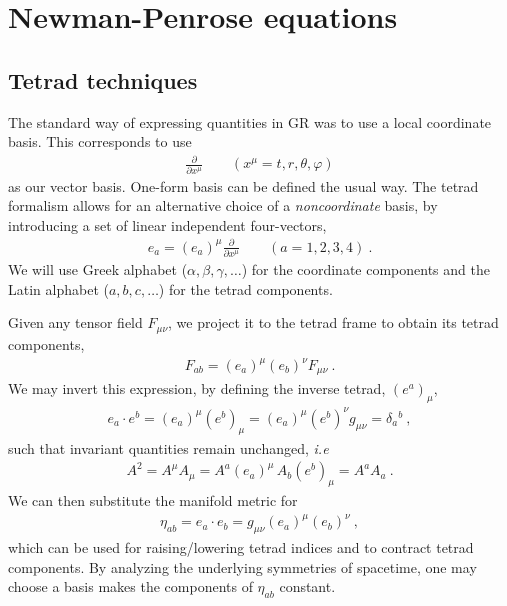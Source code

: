 
\chapter{Newman-Penrose equations} %
\label{AppendixTetrad}

\section{Tetrad techniques}

The standard way of expressing quantities in GR was to use a local coordinate basis. This corresponds to use
\begin{align}
   \frac{\partial}{\partial x^\mu} \qquad ( x^\mu = t,r,\theta,\varphi )
\end{align}
as our vector basis. One-form basis can be defined the usual way. The tetrad formalism allows for an alternative choice of a \emph{noncoordinate} basis, by introducing a set of linear independent four-vectors, 
\begin{align}
    e_a = (e_a)^\mu \frac{\partial}{\partial x^\mu} \qquad ( a = 1,2,3,4 ) ~.
 \end{align}
We will use Greek alphabet ($\alpha,\beta,\gamma,\dots$) for the coordinate components and the Latin alphabet ($a,b,c,\dots$) for the tetrad components.

Given any tensor field $F_{\mu\nu}$, we project it to the tetrad frame to obtain its tetrad components,
\begin{align}
    F_{ab} = (e_a)^\mu (e_b)^\nu F_{\mu\nu} ~.
\end{align}
We may invert this expression, by defining the inverse tetrad, $(e^a)_\mu$,
\begin{align}
    e_a \cdot e^b = (e_a)^\mu (e^b)_\mu = (e_a)^\mu (e^b)^\nu g_{\mu\nu} = \delta_a{}^b ~,
\end{align}
such that invariant quantities remain unchanged, \emph{i.e}
\begin{align}
    A^2 = A^\mu A_\mu = A^a (e_a)^\mu \, A_b (e^b)_\mu = A^a A_a~.
\end{align}
We can then substitute the manifold metric for
\begin{align}
    \eta_{ab} = e_a \cdot e_b = g_{\mu\nu} (e_a)^\mu (e_b)^\nu ~,
\end{align}
which can be used for raising/lowering tetrad indices and to contract tetrad components.
By analyzing the underlying symmetries of spacetime, one may choose a basis makes the components of $\eta_{ab}$ constant.


